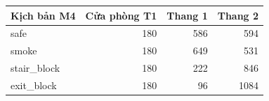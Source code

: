 \begin{center}\small
\begin{tabular}{lrrr}
\toprule
Kịch bản M4 & Cửa phòng T1 & Thang 1 & Thang 2\\\midrule
safe & 180 & 586 & 594\\
smoke & 180 & 649 & 531\\
stair\_block & 180 & 222 & 846\\
exit\_block & 180 & 96 & 1084\\
\bottomrule\end{tabular}\end{center}